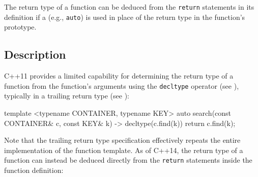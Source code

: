 
\label{autoreturn}
\label{function-(auto)-return-type-deduction}
\setcounter{table}{0}
\setcounter{footnote}{0}
\setcounter{lstlisting}{0}




The return type of a function can be deduced from the \lstinline!return!
statements in its definition if a  (e.g.,
\lstinline!auto!) is used in place of the return type in the function's
prototype.

\subsection[Description]{Description}\label{description}

C++11 provides a limited capability for determining the return type of a
function from the function's arguments using the \lstinline!decltype!
operator (see ), typically in a trailing return
type (see ):

\begin{emcppslisting}
template <typename CONTAINER, typename KEY>
auto search(const CONTAINER& c, const KEY& k) -> decltype(c.find(k))
{
    return c.find(k);
}
\end{emcppslisting}
    

\noindent Note that the trailing return type specification effectively repeats the
entire implementation of the function template. As of C++14, the return
type of a function can instead be deduced directly from the
\lstinline!return! statements inside the function definition:

